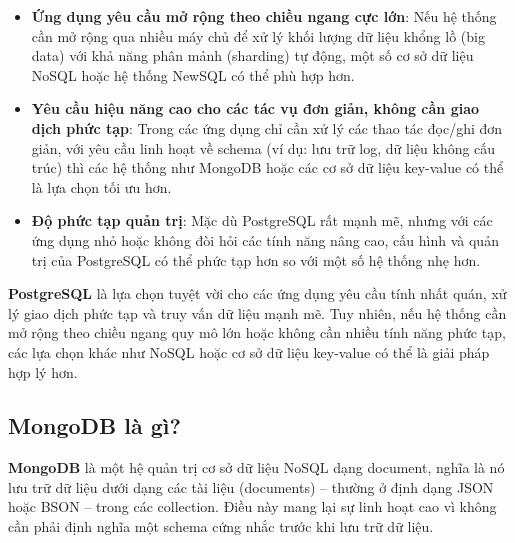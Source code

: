 \begin{itemize}
    \item \textbf{Ứng dụng yêu cầu mở rộng theo chiều ngang cực lớn}: Nếu hệ thống cần mở rộng qua nhiều máy chủ để xử lý khối lượng dữ liệu khổng lồ (big data) với khả năng phân mảnh (sharding) tự động, một số cơ sở dữ liệu NoSQL hoặc hệ thống NewSQL có thể phù hợp hơn.
    \item \textbf{Yêu cầu hiệu năng cao cho các tác vụ đơn giản, không cần giao dịch phức tạp}: Trong các ứng dụng chỉ cần xử lý các thao tác đọc/ghi đơn giản, với yêu cầu linh hoạt về schema (ví dụ: lưu trữ log, dữ liệu không cấu trúc) thì các hệ thống như MongoDB hoặc các cơ sở dữ liệu key-value có thể là lựa chọn tối ưu hơn.
    \item \textbf{Độ phức tạp quản trị}: Mặc dù PostgreSQL rất mạnh mẽ, nhưng với các ứng dụng nhỏ hoặc không đòi hỏi các tính năng nâng cao, cấu hình và quản trị của PostgreSQL có thể phức tạp hơn so với một số hệ thống nhẹ hơn.
\end{itemize}

\textbf{PostgreSQL} là lựa chọn tuyệt vời cho các ứng dụng yêu cầu tính nhất quán, xử lý giao dịch phức tạp và truy vấn dữ liệu mạnh mẽ. Tuy nhiên, nếu hệ thống cần mở rộng theo chiều ngang quy mô lớn hoặc không cần nhiều tính năng phức tạp, các lựa chọn khác như NoSQL hoặc cơ sở dữ liệu key-value có thể là giải pháp hợp lý hơn.


\subsection{MongoDB là gì?}

\textbf{MongoDB} là một hệ quản trị cơ sở dữ liệu NoSQL dạng document, nghĩa là nó lưu trữ dữ liệu dưới dạng các tài liệu (documents) – thường ở định dạng JSON hoặc BSON – trong các collection. Điều này mang lại sự linh hoạt cao vì không cần phải định nghĩa một schema cứng nhắc trước khi lưu trữ dữ liệu.




